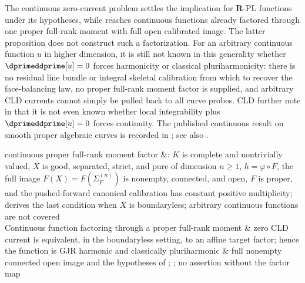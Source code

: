 
\begin{warning}{The continuous zero-current problem}
 settles the implication for
$\mathbf R$-PL functions under its hypotheses, while
 reaches continuous functions already
factored through one proper full-rank moment with full open calibrated image.
The latter proposition does not construct such a factorization.  For an
arbitrary continuous function $u$ in higher dimension, it is still not known
in this generality whether $\dprimeddprime[u]=0$ forces harmonicity or
classical pluriharmonicity: there is no residual line bundle or integral
skeletal calibration from which to recover the face-balancing law, no proper
full-rank moment factor is supplied, and arbitrary CLD currents cannot simply
be pulled back to all curve probes.  CLD further note in
\cite[Remark~7.8.3]{CLD25} that it is not even known whether local
integrability plus $\dprimeddprime[u]=0$ forces continuity.  The published
continuous result on smooth proper algebraic curves is recorded in
; see also
.
\end{warning}

continuous proper full-rank moment factor
 &: \(K\) is complete and
  nontrivially valued, \(X\) is good, separated, strict, and pure of
  dimension \(n\geq 1\), $h=\varphi\circ F$, the full image
  $F(X)=F(\Sigma_F^{(n)})$ is nonempty, connected, and open, $F$ is proper, and the
  pushed-forward canonical calibration has constant positive multiplicity;
   derives the
  last condition when $X$ is boundaryless; arbitrary continuous functions
  are not covered\\

Continuous function factoring through a proper full-rank moment &
zero CLD current is equivalent, in the boundaryless setting, to an affine
target factor; hence the function is GJR harmonic and classically
pluriharmonic & full nonempty connected open image and the hypotheses of
;
; no assertion without the factor
map\\

